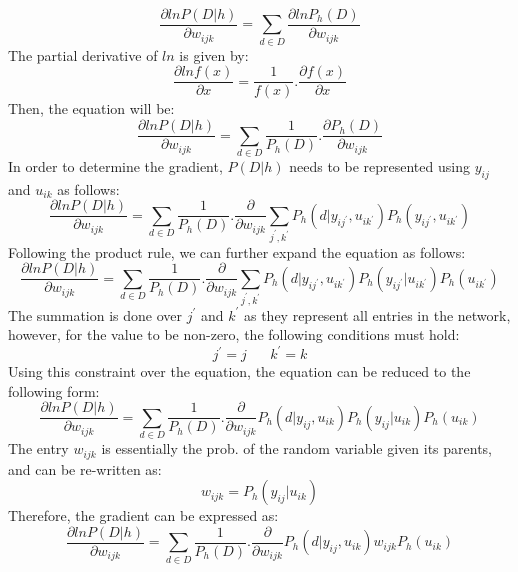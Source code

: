 \documentclass{article}
\begin{document}
\begin{equation}
\frac{\partial ln P(D|h)}{\partial w_{ijk}} = \sum_{d \in D} \frac{\partial ln P_h(D)}{\partial w_{ijk}}
\end{equation}
The partial derivative of $ln$ is given by:
\begin{equation}
\frac{\partial ln f(x)}{\partial x} = \frac{1}{f(x)}. \frac{\partial f(x)}{\partial x}
\end{equation}
Then, the equation will be:
\begin{equation}
\frac{\partial ln P(D|h)}{\partial w_{ijk}} = \sum_{d \in D} \frac{1}{P_h(D)} . \frac{\partial P_h(D)}{\partial w_{ijk}}
\end{equation}
In order to determine the gradient, $P(D|h)$ needs to be represented using $y_{ij}$ and $u_{ik}$ as follows:
\begin{equation}
\frac{\partial ln P(D|h)}{\partial w_{ijk}} = \sum_{d \in D} \frac{1}{P_h(D)} . \frac{\partial}{\partial w_{ijk}} \sum_{j^{'},k^{'}} P_h(d|y_{ij^{'}}, u_{ik^{'}})P_h(y_{ij^{'}}, u_{ik^{'}})
\end{equation}
Following the product rule, we can further expand the equation as follows:
\begin{equation}
\frac{\partial ln P(D|h)}{\partial w_{ijk}} = \sum_{d \in D} \frac{1}{P_h(D)} . \frac{\partial}{\partial w_{ijk}} \sum_{j^{'},k^{'}} P_h(d|y_{ij^{'}}, u_{ik^{'}})P_h(y_{ij^{'}}| u_{ik^{'}})P_h(u_{ik^{'}})
\end{equation}
The summation is done over $j^{'}$ and $k^{'}$ as they represent all entries in the network, however, for the value to be non-zero, the following conditions must hold:
\begin{equation}
j^{'} = j \;\;\;\;\;\; k^{'}=k
\end{equation}
Using this constraint over the equation, the equation can be reduced to the following form:
\begin{equation}
\frac{\partial ln P(D|h)}{\partial w_{ijk}} = \sum_{d \in D} \frac{1}{P_h(D)} . \frac{\partial}{\partial w_{ijk}} P_h(d|y_{ij}, u_{ik})P_h(y_{ij}| u_{ik})P_h(u_{ik})
\end{equation}
The entry $w_{ijk}$ is essentially the prob. of the random variable given its parents, and can be re-written as:
\begin{equation}
w_{ijk} = P_h(y_{ij}| u_{ik})
\end{equation}
Therefore, the gradient can be expressed as:
\begin{equation}
\frac{\partial ln P(D|h)}{\partial w_{ijk}} = \sum_{d \in D} \frac{1}{P_h(D)} . \frac{\partial}{\partial w_{ijk}} P_h(d|y_{ij}, u_{ik}) w_{ijk} P_h(u_{ik})
\end{equation}
\end{document}
